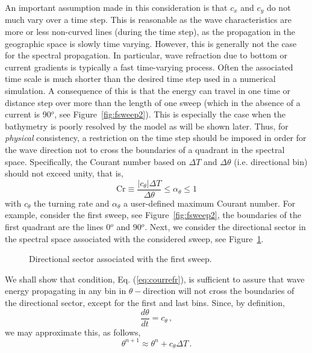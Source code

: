 \documentclass[12pt]{book}
\begin{document}
An important assumption made in this consideration is that $c_x$ and $c_y$ do not much vary over a time step. This is reasonable as the wave characteristics are more or less non-curved lines (during the time step), as
the propagation in the geographic space is slowly time varying. However, this is generally not the case for the spectral propagation. In particular, wave refraction due to bottom or current gradients is
typically a fast time-varying process. Often the associated time scale is much shorter than the desired time step used in a numerical simulation.
A consequence of this is that the energy can travel in one time or distance step over more than the length of one sweep (which in the absence of a current is 90$^o$,
see Figure~\ref{fig:fsweep2}). This is especially the case when the bathymetry is poorly resolved by the model as will be shown later.
Thus, for {\it physical} consistency, a restriction on the time step should be imposed in order for the wave direction not to cross the boundaries of a quadrant in the spectral space.
Specifically, the Courant number based on $\Delta T$ and $\Delta \theta$ (i.e. directional bin) should not exceed unity, that is,
\begin{equation}
  \mbox{Cr} \equiv \frac{|c_\theta| \Delta T}{\Delta \theta} \leq \alpha_\theta \leq 1
  \label{eq:courrefr}
\end{equation}
with $c_\theta$ the turning rate and $\alpha_\theta$ a user-defined maximum Courant number.
For example, consider the first sweep, see Figure~\ref{fig:fsweep2}, the boundaries of the first quadrant are the lines 0$^o$ and 90$^o$. Next, we consider the directional
sector in the spectral space associated with the considered sweep, see Figure~\ref{fig:sector}.
\begin{figure}[htb]
   \centerline{
              }
      \caption{Directional sector associated with the first sweep.}
      \label{fig:sector}
\end{figure}
We shall show that condition, Eq. (\ref{eq:courrefr}), is sufficient to assure that wave energy propagating in any bin in $\theta-$direction will not cross the boundaries of the directional sector,
except for the first and last bins. Since, by definition,
\begin{equation}
  \frac{d\theta}{dt} = c_\theta\, ,
\end{equation}
we may approximate this, as follows,
\begin{equation}
  \theta^{n+1} \approx \theta^n + c_\theta \Delta T\, .
  \label{eq:ctheta}
\end{equation}
\end{document}
